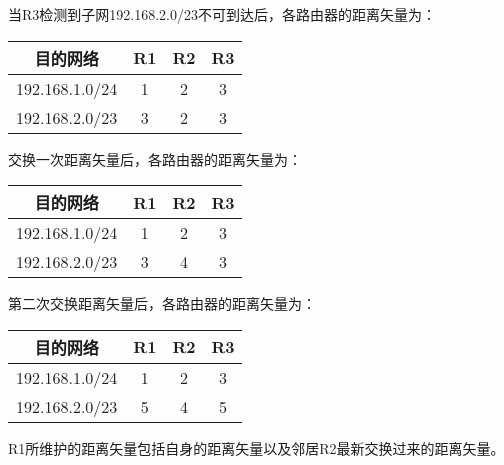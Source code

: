 \documentclass[11pt]{article}
\begin{document}
\begin{enumerate}
    当R3检测到子网192.168.2.0/23不可到达后，各路由器的距离矢量为：
    \begin{table}[htbp]
        \centering
        \begin{tabular}{|c|c|c|c|} 
            \hline
            目的网络 & R1 & R2 & R3 \\ 
            \hline
            192.168.1.0/24 & 1 & 2 & 3 \\ 
            \hline
            192.168.2.0/23 & 3 & 2 & 3 \\ 
            \hline
        \end{tabular}
        \label{table-3}
    \end{table}

    \newpage

    交换一次距离矢量后，各路由器的距离矢量为：
    \begin{table}[htbp]
        \centering
        \begin{tabular}{|c|c|c|c|} 
            \hline
            目的网络 & R1 & R2 & R3 \\ 
            \hline
            192.168.1.0/24 & 1 & 2 & 3 \\ 
            \hline
            192.168.2.0/23 & 3 & 4 & 3 \\ 
            \hline
        \end{tabular}
        \label{table-4}
    \end{table}

    第二次交换距离矢量后，各路由器的距离矢量为：
    \begin{table}[htbp]
        \centering
        \begin{tabular}{|c|c|c|c|} 
            \hline
            目的网络 & R1 & R2 & R3 \\ 
            \hline
            192.168.1.0/24 & 1 & 2 & 3 \\ 
            \hline
            192.168.2.0/23 & 5 & 4 & 5 \\ 
            \hline
        \end{tabular}
        \label{table-5}
    \end{table}
    
    R1所维护的距离矢量包括自身的距离矢量以及邻居R2最新交换过来的距离矢量。
\end{enumerate}
\end{document}
